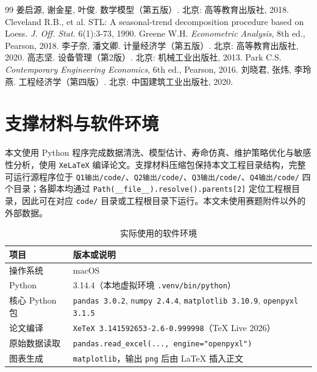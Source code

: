 \documentclass[12pt, a4paper, fontset=fandol]{ctexart}
\theoremstyle{definition}
\begin{document}
\begin{thebibliography}{99}
   姜启源, 谢金星, 叶俊. 数学模型（第五版）. 北京: 高等教育出版社, 2018.
   Cleveland R.B., et al. STL: A seasonal-trend decomposition procedure based on Loess. \emph{J. Off. Stat.} 6(1):3-73, 1990.
   Greene W.H. \emph{Econometric Analysis}, 8th ed., Pearson, 2018.
   李子奈, 潘文卿. 计量经济学（第五版）. 北京: 高等教育出版社, 2020.
   高志坚. 设备管理（第2版）. 北京: 机械工业出版社, 2013.
   Park C.S. \emph{Contemporary Engineering Economics}, 6th ed., Pearson, 2016.
   刘晓君, 张炜, 李玲燕. 工程经济学（第四版）. 北京: 中国建筑工业出版社, 2020.
\end{thebibliography}

\appendix

\section{支撑材料与软件环境}

本文使用 Python 程序完成数据清洗、模型估计、寿命仿真、维护策略优化与敏感性分析，使用 \texttt{XeLaTeX} 编译论文。支撑材料压缩包保持本文工程目录结构，完整可运行源程序位于 \texttt{Q1输出/code/}、\texttt{Q2输出/code/}、\texttt{Q3输出/code/}、\texttt{Q4输出/code/} 四个目录；各脚本均通过 \texttt{Path(\_\_file\_\_).resolve().parents[2]} 定位工程根目录，因此可在对应 \texttt{code/} 目录或工程根目录下运行。本文未使用赛题附件以外的外部数据。

\begin{table}[H]
\centering
\caption{实际使用的软件环境}
\small
\begin{tabular}{ll}
\toprule
项目 & 版本或说明 \\
\midrule
操作系统 & macOS \\
Python & 3.14.4（本地虚拟环境 \texttt{.venv/bin/python}） \\
核心 Python 包 & \texttt{pandas 3.0.2}, \texttt{numpy 2.4.4}, \texttt{matplotlib 3.10.9}, \texttt{openpyxl 3.1.5} \\
论文编译 & \texttt{XeTeX 3.141592653-2.6-0.999998}（TeX Live 2026） \\
原始数据读取 & \texttt{pandas.read\_excel(..., engine="openpyxl")} \\
图表生成 & \texttt{matplotlib}，输出 \texttt{png} 后由 LaTeX 插入正文 \\
\bottomrule
\end{tabular}
\end{table}
\end{document}
